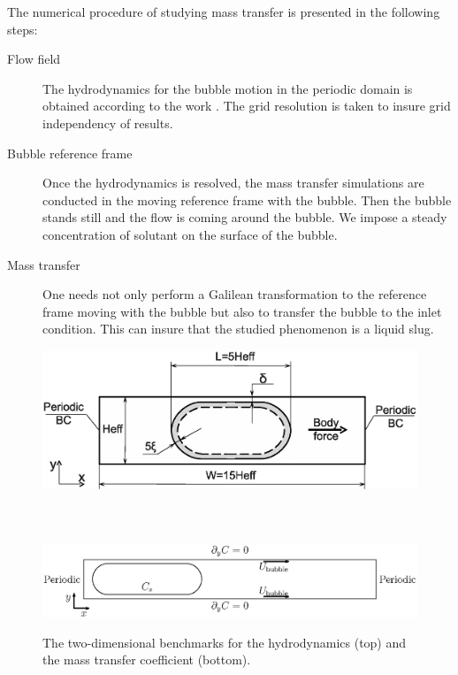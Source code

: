 \documentclass{article}
\begin{document}
The numerical  procedure of studying mass transfer is presented in the following steps:
\begin{description}
 \item[Flow field] The hydrodynamics for the bubble motion in the periodic domain is obtained
according to the work \cite{kuzmin-binary2d}. The grid resolution is taken to insure grid
independency of results.  
 \item[Bubble reference frame] Once the hydrodynamics is resolved, the mass transfer simulations
are conducted in the moving
reference frame with the bubble. Then the bubble stands still and the flow is coming around the
bubble. We impose a steady concentration of solutant on the surface of the bubble.
\item[Mass transfer] One needs not only perform a Galilean transformation to the reference
frame moving with the bubble but also to
transfer the bubble to the inlet condition. This can insure that the studied phenomenon is a liquid
slug. 
\end{description}
\begin{figure}[htb!]
\includegraphics[width=\textwidth]{Figures/benchmark_new.eps}\\
\\
\\
\\
\includegraphics[width=\textwidth]{Figures/benchmark_periodic.eps}
\caption{The two-dimensional benchmarks for the hydrodynamics (top) and the mass transfer
coefficient (bottom). \label{fig:benchmark}}
\end{figure}
\end{document}

